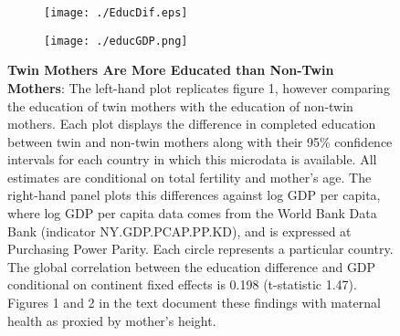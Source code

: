 \documentclass{nature}
\begin{document}
\begin{linenumbers}
\begin{spacing}{1}
\begin{figure}[htpb!]
\begin{subfigure}{.5\textwidth}
  \texttt{[image: ./EducDif.eps]}
\end{subfigure}%
\begin{subfigure}{.5\textwidth}
  \texttt{[image: ./educGDP.png]}
\end{subfigure}%
\vspace{5mm}
\caption{\textbf{Twin Mothers Are More Educated than Non-Twin Mothers}: {\footnotesize The left-hand plot replicates figure 1, however comparing the education of twin mothers with the education of non-twin mothers.  Each plot displays the difference in completed education between twin and non-twin mothers along with their 95\% confidence intervals for each country in which this microdata is available.  All estimates are conditional on total fertility and mother's age.  The right-hand panel plots this differences against log GDP per capita, where log GDP per capita data comes from the World Bank Data Bank (indicator NY.GDP.PCAP.PP.KD), and is expressed at Purchasing Power Parity.  Each circle represents a particular country. The global correlation between the education difference and GDP conditional on continent fixed effects is 0.198 (t-statistic 1.47). Figures 1 and 2 in the text document these findings with maternal health as proxied by mother's height.}}
\end{figure}


\end{spacing}
\end{linenumbers}
\end{document}
